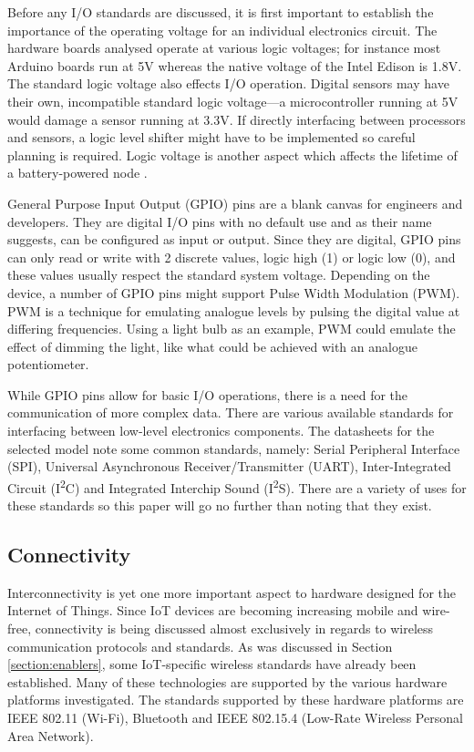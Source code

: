       Before any I/O standards are discussed, it is first important to establish the importance of the operating voltage for an individual electronics circuit. The hardware boards analysed operate at various logic voltages; for instance most Arduino boards run at 5V whereas the native voltage of the Intel Edison is 1.8V. The standard logic voltage also effects I/O operation. Digital sensors may have their own, incompatible standard logic voltage---a microcontroller running at 5V would damage a sensor running at 3.3V. If directly interfacing between processors and sensors, a logic level shifter might have to be implemented so careful planning is required. Logic voltage is another aspect which affects the lifetime of a battery-powered node \citep{wsnpower:2010}.

      General Purpose Input Output (GPIO) pins are a blank canvas for engineers and developers. They are digital I/O pins with no default use and as their name suggests, can be configured as input or output. Since they are digital, GPIO pins can only read or write with 2 discrete values, logic high (1) or logic low (0), and these values usually respect the standard system voltage. Depending on the device, a number of GPIO pins might support Pulse Width Modulation (PWM). PWM is a technique for emulating analogue levels by pulsing the digital value at differing frequencies. Using a light bulb as an example, PWM could emulate the effect of dimming the light, like what could be achieved with an analogue potentiometer.

      While GPIO pins allow for basic I/O operations, there is a need for the communication of more complex data. There are various available standards for interfacing between low-level electronics components. The datasheets for the selected model note some common standards, namely: Serial Peripheral Interface (SPI), Universal Asynchronous Receiver/Transmitter (UART), Inter-Integrated Circuit (I\textsuperscript{2}C) and Integrated Interchip Sound (I\textsuperscript{2}S). There are a variety of uses for these standards so this paper will go no further than noting that they exist.

    \subsection{Connectivity}
    \label{section:connectivity}
      Interconnectivity is yet one more important aspect to hardware designed for the Internet of Things. Since IoT devices are becoming increasing mobile and wire-free, connectivity is being discussed almost exclusively in regards to wireless communication protocols and standards. As was discussed in Section \ref{section:enablers}, some IoT-specific wireless standards have already been established. Many of these technologies are supported by the various hardware platforms investigated. The standards supported by these hardware platforms are IEEE 802.11 (Wi-Fi), Bluetooth and IEEE 802.15.4 (Low-Rate Wireless Personal Area Network). 

